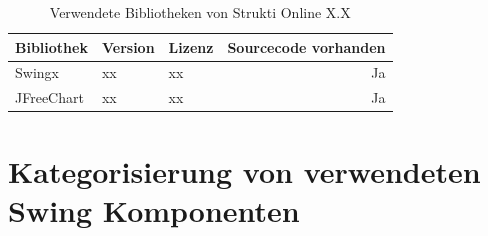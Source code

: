   \begin{table}[ht]
    \begin{center}
      \begin{tabular}{lllr}
        \toprule
        Bibliothek & Version & Lizenz & Sourcecode vorhanden \\
        \midrule
        Swingx & xx & xx & Ja\\
        JFreeChart & xx & xx & Ja\\
        \bottomrule
      \end{tabular}
      \caption{Verwendete Bibliotheken von Strukti Online X.X}
      \label{tab:bibliothekenStruktiOnline}
    \end{center}
  \end{table}
  
  \section{Kategorisierung von verwendeten Swing Komponenten}